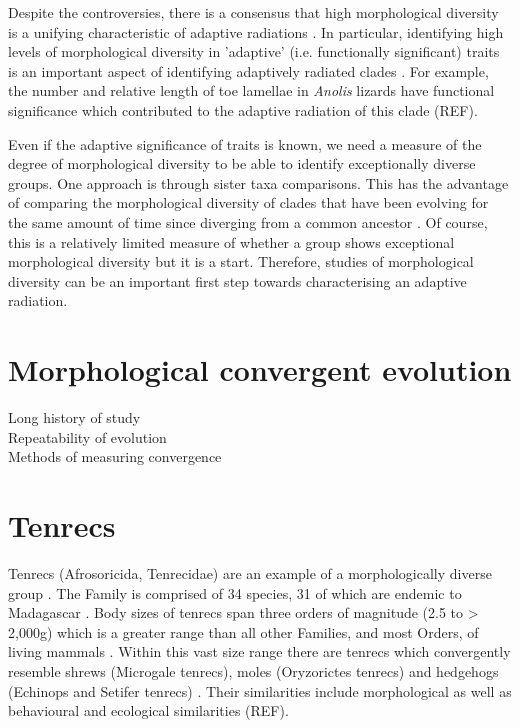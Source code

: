 		
	Despite the controversies, there is a consensus that high morphological diversity is a unifying characteristic of adaptive radiations \citep{Losos2010a, Olson2009}. In particular, identifying high levels of morphological diversity in 'adaptive' (i.e. functionally significant) traits is an important aspect of identifying adaptively radiated clades \citep{Losos2010a}. For example, the number and relative length of toe lamellae in \textit{Anolis} lizards have functional significance which contributed to the adaptive radiation of this clade (REF).
	
	Even if the adaptive significance of traits is known, we need a measure of the degree of morphological diversity to be able to identify exceptionally diverse groups. One approach is through sister taxa comparisons. This has the advantage of comparing the morphological diversity of clades that have been evolving for the same amount of time since diverging from a common ancestor \citep{Losos2002}. Of course, this is a relatively limited measure of whether a group shows exceptional morphological diversity but it is a start.
	Therefore, studies of morphological diversity can be an important first step towards characterising an adaptive radiation.

\section{Morphological convergent evolution}
Long history of study\\
Repeatability of evolution\\
Methods of measuring convergence

\section{Tenrecs}
	Tenrecs (Afrosoricida, Tenrecidae) are an example of a morphologically diverse group \citep{Soarimalala2011, Eisenberg1969}. The Family is comprised of 34 species, 31 of which are endemic to Madagascar \citep{Olson2013}. Body sizes of tenrecs span three orders of magnitude (2.5 to > 2,000g) which is a greater range than all other Families, and most Orders, of living mammals \citep{Olson2003}.
	Within this vast size range there are tenrecs which convergently resemble shrews (Microgale tenrecs), moles (Oryzorictes tenrecs) and hedgehogs (Echinops and Setifer tenrecs) \citep{Eisenberg1969}. Their similarities include morphological as well as behavioural and ecological similarities (REF). 

